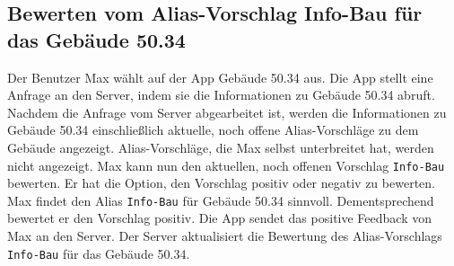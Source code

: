 \subsection{Bewerten vom Alias-Vorschlag Info-Bau für das Gebäude 50.34}

Der Benutzer Max wählt auf der App Gebäude 50.34 aus.
Die App stellt eine Anfrage an den Server, indem sie die Informationen zu Gebäude 50.34 abruft. 
Nachdem die Anfrage vom Server abgearbeitet ist, werden die Informationen zu Gebäude 50.34 einschließlich aktuelle, noch offene Alias-Vorschläge zu dem Gebäude angezeigt.
Alias-Vorschläge, die Max selbst unterbreitet hat, werden nicht angezeigt.
Max kann nun den aktuellen, noch offenen Vorschlag \texttt{Info-Bau} bewerten.
Er hat die Option, den Vorschlag positiv oder negativ zu bewerten.
Max findet den Alias \texttt{Info-Bau} für Gebäude 50.34 sinnvoll.
Dementsprechend bewertet er den Vorschlag positiv.
Die App sendet das positive Feedback von Max an den Server.
Der Server aktualisiert die Bewertung des Alias-Vorschlags \texttt{Info-Bau} für das Gebäude 50.34.